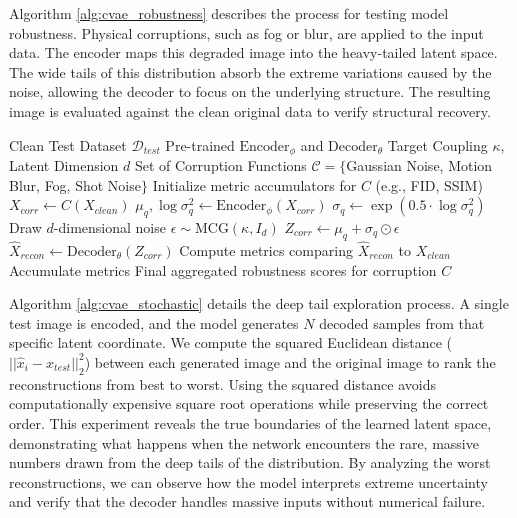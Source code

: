 \documentclass[twoside,11pt]{article}
\begin{document}
Algorithm \ref{alg:cvae_robustness} describes the process for testing model robustness. Physical corruptions, such as fog or blur, are applied to the input data. The encoder maps this degraded image into the heavy-tailed latent space. The wide tails of this distribution absorb the extreme variations caused by the noise, allowing the decoder to focus on the underlying structure. The resulting image is evaluated against the clean original data to verify structural recovery.

\begin{algorithm}[H]
\caption{CVAE Robustness Inference (Image Corruptions)}
\label{alg:cvae_robustness}
\begin{algorithmic}[1]
\Require Clean Test Dataset $\mathcal{D}_{test}$
\Require Pre-trained $\text{Encoder}_\phi$ and $\text{Decoder}_\theta$
\Require Target Coupling $\kappa$, Latent Dimension $d$
\Require Set of Corruption Functions $\mathcal{C} = \{$Gaussian Noise, Motion Blur, Fog, Shot Noise$\}$
\Statex
{}
    \State Initialize metric accumulators for $C$ (e.g., FID, SSIM)
        \State {}
        \State $X_{corr} \leftarrow C(X_{clean})$
        \Statex
        \State {}
        \State $\mu_q, \log\sigma_q^2 \leftarrow \text{Encoder}_\phi(X_{corr})$
        \State $\sigma_q \leftarrow \exp(0.5 \cdot \log\sigma_q^2)$
        \Statex
        \State {}
        \State {}
        \State Draw $d$-dimensional noise $\epsilon \sim \text{MCG}(\kappa, I_d)$
        \State $Z_{corr} \leftarrow \mu_q + \sigma_q \odot \epsilon$
        \Statex
        \State {}
        \State $\hat{X}_{recon} \leftarrow \text{Decoder}_\theta(Z_{corr})$
        \Statex
        \State {}
        \State Compute metrics comparing $\hat{X}_{recon}$ to $X_{clean}$
        \State Accumulate metrics
    \EndFor
    \State \Return Final aggregated robustness scores for corruption $C$
\EndFor
\end{algorithmic}
\end{algorithm}

Algorithm \ref{alg:cvae_stochastic} details the deep tail exploration process. A single test image is encoded, and the model generates $N$ decoded samples from that specific latent coordinate. We compute the squared Euclidean distance ($|| \hat{x}_i - x_{test} ||_2^2$) between each generated image and the original image to rank the reconstructions from best to worst. Using the squared distance avoids computationally expensive square root operations while preserving the correct order. This experiment reveals the true boundaries of the learned latent space, demonstrating what happens when the network encounters the rare, massive numbers drawn from the deep tails of the distribution. By analyzing the worst reconstructions, we can observe how the model interprets extreme uncertainty and verify that the decoder handles massive inputs without numerical failure.
\end{document}
